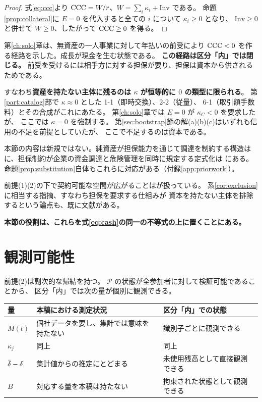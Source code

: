 \begin{proof}
式\eqref{eq:ccc}より $\mathrm{CCC}=W/r$、$W=\sum_i\kappa_i+\mathrm{Inv}$ である。
命題\ref{prop:collateral}に $E=0$ を代入すると全ての $i$ について $\kappa_i\geq 0$ となり、
$\mathrm{Inv}\geq 0$ と併せて $W\geq 0$、したがって $\mathrm{CCC}\geq 0$ を得る。
\end{proof}

第\ref{ch:solo}章は、無資産の一人事業に対して年払いの前受により
$\mathrm{CCC}<0$ を作る経路を示した。成長が現金を生む状態である。
\textbf{この経路は区分「内」では閉じる。}
前受を受けるには相手方に対する担保が要り、担保は資本から供されるためである。

すなわち\textbf{資産を持たない主体に残るのは $\kappa$ が恒等的に $0$ の類型に限られる}。
第\ref{part:catalog}部で $\kappa\approx 0$ とした 1-1（即時交換）、2-2（従量）、
6-1（取引額手数料）とその合成がこれにあたる。
第\ref{ch:solo}章では $E=0$ が $\kappa_C<0$ を要求したが、
ここでは $\kappa=0$ を強制する。
第\ref{sec:bootstrap}節の解(a)(b)(c)はいずれも信用の不足を前提としていたが、
ここで不足するのは資本である。

\begin{remark}[既存理論との対応]
\label{rem:collateral-priorwork}
本節の内容は新規ではない。純資産が担保能力を通じて調達を制約する構造は
\cite{kiyotaki1997}に、担保制約が企業の資金調達と危険管理を同時に規定する定式化は
\cite{rampini2010,rampini2013}にある。
命題\ref{prop:substitution}自体もこれらに対応がある（付録\ref{app:priorwork}）。

前提(1)(2)の下で契約可能な空間が広がることは\cite{cong2019}が扱っている。
系\ref{cor:exclusion}に相当する指摘、すなわち担保を要求する仕組みが
資本を持たない主体を排除するという論点も、既に文献がある\cite{oecd2024}。

\textbf{本節の役割は、これらを式\eqref{eq:cash}の同一の不等式の上に置くことにある。}
\end{remark}

\section{観測可能性}
\label{sec:protocol-observability}

前提(2)は副次的な帰結を持つ。
$\mathcal{P}$ の状態が全参加者に対して検証可能であることから、
区分「内」では次の量が個別に観測できる。

\begin{center}
\begin{tabularx}{\textwidth}{@{}lXX@{}}
\toprule
量 & 本稿における測定状況 & 区分「内」での状態 \\
\midrule
$M(t)$ & 個社データを要し、集計では意味を持たない & 識別子ごとに観測できる \\
$\kappa_j$ & 同上 & 同上 \\
$\dbar-\delta$ & 集計値からの推定にとどまる & 未使用残高として直接観測できる \\
$B$ & 対応する量を本稿は持たない & 拘束された状態として観測できる \\
\bottomrule
\end{tabularx}
\label{tab:protocol-observability}
\end{center}

